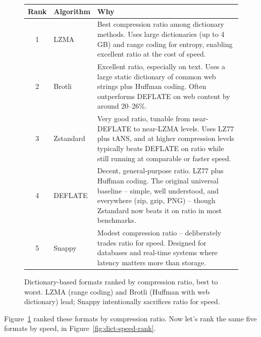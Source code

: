 \documentclass[11pt]{article}
\begin{document}
\begin{figure}[H]
\centering
\begin{tabular}{@{}cp{4.0cm}p{6.5cm}@{}}
\toprule
\textbf{Rank} & \textbf{Algorithm} & \textbf{Why} \\
\midrule
1 & \textcolor{dictcol}{LZMA} &
Best compression ratio among dictionary methods. Uses large dictionaries
(up to 4\,GB) and \textcolor{nonprefixcol}{range coding} for entropy,
enabling excellent ratio at the cost of speed. \\[4pt]
2 & \textcolor{dictcol}{Brotli} &
Excellent ratio, especially on text. Uses a large static dictionary of
common web strings plus \textcolor{prefixcol}{Huffman coding}. Often
outperforms DEFLATE on web content by around 20--26\%. \\[4pt]
3 & \textcolor{dictcol}{Zstandard} &
Very good ratio, tunable from near-DEFLATE to near-LZMA levels. Uses LZ77
plus \textcolor{bestcol}{tANS}, and at higher compression levels typically
beats DEFLATE on ratio while still running at comparable or faster speed.
\\[4pt]
4 & \textcolor{dictcol}{DEFLATE} &
Decent, general-purpose ratio. LZ77 plus \textcolor{prefixcol}{Huffman
coding}. The original universal baseline -- simple, well understood, and
everywhere (zip, gzip, PNG) -- though Zstandard now beats it on ratio in
most benchmarks. \\[4pt]
5 & \textcolor{dictcol}{Snappy} &
Modest compression ratio -- deliberately trades ratio for speed. Designed
for databases and real-time systems where latency matters more than
storage. \\
\bottomrule
\end{tabular}
\caption{Dictionary-based formats ranked by compression ratio, best to
worst. LZMA (range coding) and Brotli (Huffman with web dictionary) lead;
Snappy intentionally sacrifices ratio for speed.}
\label{fig:dict-ratio-rank}
\end{figure}

Figure~\ref{fig:dict-ratio-rank} ranked these formats by compression ratio.
Now let's rank the same five formats by speed, in
Figure~\ref{fig:dict-speed-rank}.
\end{document}
